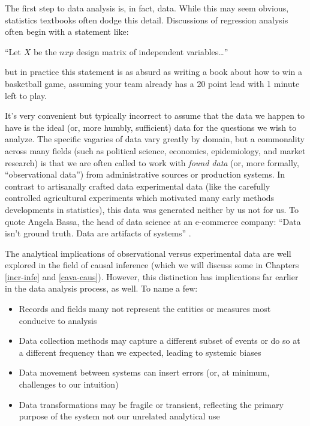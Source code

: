 \documentclass[
]{krantz}
\providecommand{\tightlist}{%
  \setlength{\itemsep}{0pt}\setlength{\parskip}{0pt}}
\renewenvironment{quote}{\begin{VF}}{\end{VF}}
\begin{document}
The first step to data analysis is, in fact, data. While this may seem obvious, statistics textbooks often dodge this detail.
Discussions of regression analysis often begin with a statement like:

\begin{quote}
``Let \(X\) be the \(n x p\) design matrix of independent variables\ldots{}''
\end{quote}

but in practice this statement is as absurd as writing a book about how to win a basketball game, assuming your team already has a 20 point lead with 1 minute left to play.

It's very convenient but typically incorrect to assume that the data we happen to have is the ideal (or, more humbly, sufficient) data for the questions we wish to analyze.
The specific vagaries of data vary greatly by domain, but a commonality across many fields (such as political science, economics, epidemiology, and market research) is that we are often called to work with \emph{found data} (or, more formally, ``observational data'') from administrative sources or production systems.
In contrast to artisanally crafted data experimental data (like the carefully controlled agricultural experiments which motivated many early methods developments in statistics), this data was generated neither by us not for us.
To quote Angela Bassa, the head of data science at an e-commerce company: ``Data isn't ground truth. Data are artifacts of systems'' \citep{bassa_2017}.

The analytical implications of observational versus experimental data are well explored in the field of causal inference (which we will discuss some in Chapters \ref{incr-infe} and \ref{cava-caus}).
However, this distinction has implications far earlier in the data analysis process, as well.
To name a few:

\begin{itemize}
\tightlist
\item
  Records and fields many not represent the entities or measures most conducive to analysis
\item
  Data collection methods may capture a different subset of events or do so at a different frequency than we expected, leading to systemic biases
\item
  Data movement between systems can insert errors (or, at minimum, challenges to our intuition)
\item
  Data transformations may be fragile or transient, reflecting the primary purpose of the system not our unrelated analytical use
\end{itemize}
\end{document}
